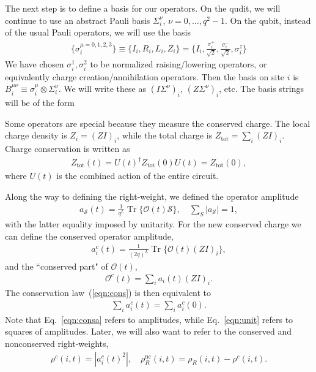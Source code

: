 \documentclass[a4paper,12pt]{article}
\renewcommand{\cal}{\mathcal}
\renewcommand{\th}[1]{\frac{1}{#1}}
\newcommand{\abs}[1]{\left| #1 \right|}
\renewcommand{\S}{\mathcal{S}}
\newcommand{\nc}{\text{nc}}
\newcommand{\tot}{\text{tot}}
\newcommand{\note}[1]{{\color{red}{#1}}}
\DeclareMathOperator{\Tr}{Tr}
\begin{document}
The next step is to define a basis for our operators. On the qudit, we will continue to use an abstract Pauli basis $\Sigma_i^\nu$, $\nu=0,\dots,q^2-1$. On the qubit, instead of the usual Pauli operators, we will use the basis~\cite{KhemaniOpSp}
\begin{align}
\{\sigma_i^{\mu=0,1,2,3}\} \equiv \{I_i, R_i, L_i,Z_i\}=\{I_i,\frac{\sigma_i^+}{\sqrt{2}}, \frac{\sigma_i^-}{\sqrt{2}}, \sigma_i^z\}
\end{align}
We have chosen $\sigma_i^1, \sigma_i^2$ to be normalized raising/lowering operators, or equivalently charge creation/annihilation operators. Then the basis on site $i$ is $B_i^{\mu\nu} \equiv \sigma_i^\mu \otimes \Sigma_i^\nu$. We will write these as $(I\Sigma^\nu)_i$, $(Z\Sigma^\nu)_i$, etc. The basis strings will be of the form \note{$\S=\otimes_iB_i^{\mu_i\nu_i}$.}

Some operators are special because they measure the conserved charge. The local charge density is $Z_i=(ZI)_i$, while the total charge is $Z_\tot=\sum_i(ZI)_i$. Charge conservation is written as 
\begin{align}
Z_\tot(t) = U(t)^\dag Z_\tot(0)U(t) = Z_\tot(0), \label{eqn:cons}
\end{align}
where $U(t)$ is the combined action of the entire circuit.

Along the way to defining the right-weight, we defined the operator amplitude
\begin{align}
a_\S(t) = \th{q^L}\Tr\{ \cal{O}(t)\S \},\quad \sum_S\abs{a_\S} = 1, \label{eqn:unit}
\end{align}
with the latter equality imposed by unitarity. For the new conserved charge we can define the conserved operator amplitude,
\begin{align}
a_i^c(t) = \th{(2q)^{L}}\Tr\{\cal{O}(t)(ZI)_i\},
\end{align}
and  the ``conserved part" of $\cal{O}(t)$,
\begin{align}
\cal{O}^c(t)=\sum_i a_i(t)(ZI)_i.
\end{align}
The conservation law~(\ref{eqn:cons}) is then equivalent to 
\begin{align}
\sum_i a_i^c(t)=\sum_i a_i^c(0). \label{eqn:consa}
\end{align}
Note that Eq.~\ref{eqn:consa} refers to amplitudes, while Eq.~\ref{eqn:unit} refers to squares of amplitudes. Later, we will also want to refer to the conserved and nonconserved right-weights, 
\begin{align}
\rho^c(i,t) = \abs{a^c_i(t)^2}, \quad \rho_R^\nc(i,t) = \rho_R(i,t)- 
	\rho^c(i,t).
\end{align}
\end{document}
